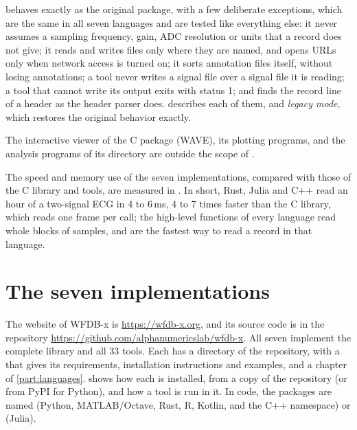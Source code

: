 \wfdbx{} behaves exactly as the original package, with a few deliberate
exceptions, which are the same in all seven languages and are tested like
everything else: it never assumes a sampling frequency, gain, ADC resolution
or units that a record does not give; it reads and writes files only where
they are named, and opens URLs only when network access is turned on; it
sorts annotation files itself, without losing annotations; a tool never
writes a signal file over a signal file it is reading; a tool that cannot
write its output exits with status 1; and  finds the record
line of a header as the header parser does.  describes
each of them, and \emph{legacy mode}, which restores the original behavior
exactly.

The interactive viewer of the C package (WAVE), its plotting programs, and
the analysis programs of its  directory are outside the scope of
\wfdbx{}.

The speed and memory use of the seven implementations, compared with those
of the C library and tools, are measured in . In
short, Rust, Julia and C++ read an hour of a two-signal ECG in 4 to 6\,ms,
4 to 7 times faster than the C library, which reads one frame per
 call; the high-level functions of every language read whole
blocks of samples, and are the fastest way to read a record in that
language.

\section{The seven implementations}
\label{sec:implementations}

The website of WFDB-x is \url{https://wfdb-x.org}, and its source code is in
the repository \url{https://github.com/alphanumericslab/wfdb-x}.
All seven implement the complete library and all 33 tools. Each has a
directory of the repository, with a  that gives its
requirements, installation instructions and examples, and a chapter of
\cref{part:languages}.  shows how each is
installed, from a copy of the repository (or from PyPI for Python), and how
a tool is run in it. In code, the packages are named  (Python,
MATLAB/Octave, Rust, R, Kotlin, and the C++ namespace) or 
(Julia).

